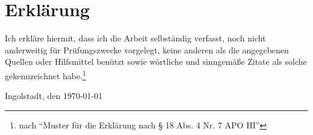 \printbibliography

\chapter*{Erklärung}

Ich erkläre hiermit, dass ich die Arbeit selbständig verfasst, noch nicht anderweitig für Prüfungszwecke vorgelegt, keine anderen als die angegebenen Quellen oder Hilfsmittel benützt sowie wörtliche und sinngemäße Zitate als solche gekennzeichnet habe.\footnote{nach \enquote{Muster für die Erklärung nach § 18 Abs. 4 Nr. 7 APO HI}}

\vspace{2\baselineskip}
\noindent Ingolstadt, den \today
\par\noindent\makebox[2.5in]{} \hfill\makebox[2.0in]{\hrulefill}%
\par\noindent\makebox[2.5in][l]{} \hfill{}